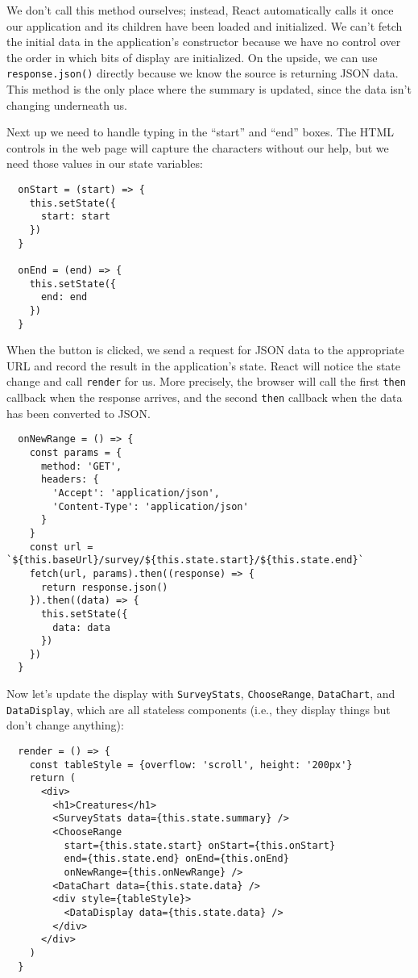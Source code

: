 We don't call this method ourselves;
instead,
React automatically calls it once our application and its children have been loaded and initialized.
We can't fetch the initial data in the application's constructor because
we have no control over the order in which bits of display are initialized.
On the upside,
we can use \texttt{response.json()} directly because we know the source is returning JSON data.
This method is the only place where the summary is updated,
since the data isn't changing underneath us.

Next up we need to handle typing in the ``start'' and ``end'' boxes.
The HTML controls in the web page will capture the characters without our help,
but we need those values in our state variables:

\begin{verbatim}
  onStart = (start) => {
    this.setState({
      start: start
    })
  }

  onEnd = (end) => {
    this.setState({
      end: end
    })
  }
\end{verbatim}

When the button is clicked,
we send a request for JSON data to the appropriate URL
and record the result in the application's state.
React will notice the state change and call \texttt{render} for us.
More precisely,
the browser will call the first \texttt{then} callback when the response arrives,
and the second \texttt{then} callback when the data has been converted to JSON.

\begin{verbatim}
  onNewRange = () => {
    const params = {
      method: 'GET',
      headers: {
        'Accept': 'application/json',
        'Content-Type': 'application/json'
      }
    }
    const url = `${this.baseUrl}/survey/${this.state.start}/${this.state.end}`
    fetch(url, params).then((response) => {
      return response.json()
    }).then((data) => {
      this.setState({
        data: data
      })
    })
  }
\end{verbatim}

Now let's update the display with \texttt{SurveyStats},
\texttt{ChooseRange}, \texttt{DataChart}, and \texttt{DataDisplay},
which are all stateless components
(i.e., they display things but don't change anything):

\begin{verbatim}
  render = () => {
    const tableStyle = {overflow: 'scroll', height: '200px'}
    return (
      <div>
        <h1>Creatures</h1>
        <SurveyStats data={this.state.summary} />
        <ChooseRange
          start={this.state.start} onStart={this.onStart}
          end={this.state.end} onEnd={this.onEnd}
          onNewRange={this.onNewRange} />
        <DataChart data={this.state.data} />
        <div style={tableStyle}>
          <DataDisplay data={this.state.data} />
        </div>
      </div>
    )
  }
\end{verbatim}

